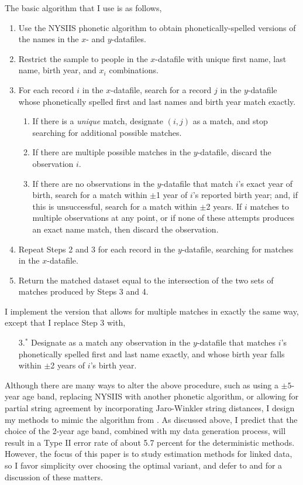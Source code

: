 \documentclass[12pt]{article}
\begin{document}
The basic algorithm that I use is as follows, 
\begin{enumerate}
\item Use the NYSIIS phonetic algorithm to obtain phonetically-spelled versions of the names in the $x$- and $y$-datafiles.
\item Restrict the sample to people in the $x$-datafile with unique first name, last name, birth year, and $x_{i}$ combinations. 
\item For each record $i$ in the $x$-datafile, search for a record $j$ in the $y$-datafile whose phonetically spelled first and last names and birth year match exactly.  
\begin{enumerate}
\item If there is a \textit{unique} match, designate $(i,j)$ as a match, and stop searching for additional possible matches. 
\item If there are multiple possible matches in the $y$-datafile, discard the observation $i$.
\item If there are no observations in the $y$-datafile that match $i$'s exact year of birth, search for a match within $\pm$1 year of $i$'s reported birth year; and, if this is unsuccessful, search for a match within $\pm$2 years.  If $i$ matches to multiple observations at any point, or if none of these attempts produces an exact name match, then discard the observation.
\end{enumerate}
\item Repeat Steps 2 and 3 for each record in the $y$-datafile, searching for matches in the $x$-datafile.  
\item Return the matched dataset equal to the intersection of the two sets of matches produced by Steps 3 and 4. 
\end{enumerate}
I implement the version that allows for multiple matches in exactly the same way, except that I replace Step 3 with,
\begin{enumerate}
\item[3.$^*$] Designate as a match any observation in the $y$-datafile that matches $i$'s phonetically spelled first and last name exactly, and whose birth year falls within $\pm$2 years of $i$'s birth year. 
\end{enumerate}

Although there are many ways to alter the above procedure, such as using a $\pm5$-year age band, replacing NYSIIS with another phonetic algorithm, or allowing for partial string agreement by incorporating Jaro-Winkler string distances, I design my methods to mimic the algorithm from \citet*{abe2019}.   As discussed above, I predict that the choice of the 2-year age band, combined with my data generation process, will result in a Type II error rate of about 5.7 percent for the deterministic methods.  However, the focus of this paper is to study estimation methods for linked data, so I favor simplicity over choosing the optimal variant, and defer to \citet*{bailey2017} and \citet*{abe2019} for a discussion of these matters.  
\end{document}
